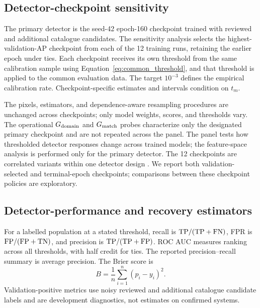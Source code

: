 \subsection{Detector-checkpoint sensitivity}
\label{sec:checkpoint_sensitivity_methods}

The primary detector is the seed-42 epoch-160 checkpoint trained with reviewed
and additional catalogue candidates. The sensitivity analysis selects the
highest-validation-AP checkpoint from each of the 12 training runs, retaining the earlier epoch
under ties. Each checkpoint receives its own threshold from the same
calibration sample using Equation~\ref{eq:common_threshold}, and that
threshold is applied to the common evaluation data.
The target \(10^{-3}\) defines the empirical calibration rate.
Checkpoint-specific estimates and intervals condition on \(t_m\).

The pixels, estimators, and dependence-aware resampling procedures are
unchanged across checkpoints; only model weights, scores, and thresholds
vary. The operational \(G_{\rm domain}\) and \(G_{\rm match}\) probes
characterize only the designated primary checkpoint and are not repeated
across the panel. The panel tests how thresholded detector responses change
across trained models; the feature-space analysis is performed only for the
primary detector. The 12 checkpoints are correlated variants within one
detector design \citep{Schaefer2018,Canameras2024}. We report both
validation-selected and terminal-epoch checkpoints; comparisons between
these checkpoint policies are exploratory.

\subsection{Detector-performance and recovery estimators}
\label{sec:performance_estimators}

For a labelled population at a stated threshold, recall is
\({\rm TP}/({\rm TP}+{\rm FN})\), FPR is
\({\rm FP}/({\rm FP}+{\rm TN})\), and precision is
\({\rm TP}/({\rm TP}+{\rm FP})\). ROC AUC measures ranking across all
thresholds, with half credit for ties. The reported precision--recall summary
is average precision. The Brier score is
\begin{equation}
 B = \frac{1}{n}\sum_{i=1}^{n}(p_i-y_i)^2 .
\label{eq:brier_score}
\end{equation}
Validation-positive metrics use noisy reviewed and additional catalogue
candidate labels and are development diagnostics, not estimates on confirmed
systems.

